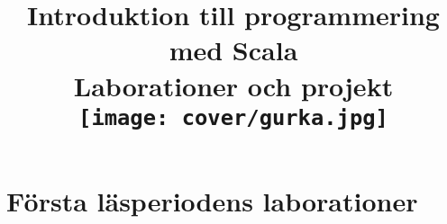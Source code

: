 \documentclass[a4paper]{compendium}
\title{
{\vspace{-3.0cm}\bf\sffamily\Huge\selectfont  Introduktion till programmering med Scala}
\\ \vspace{1em}%
{\sffamily  Laborationer och projekt}\\\vspace{2cm}
\texttt{[image: cover/gurka.jpg]}
}
\date{\raggedbottom%
\vspace{-2em}\begin{minipage}{1.0\textwidth}\centering
\CourseCode, Lp1-2, HT \CurrentYear\\
Datavetenskap, LTH\\
Lunds Universitet\\
~\\
Kompileringsdatum: \today \\
\url{https://lunduniversity.github.io/pgk}
\end{minipage}
}
\newcommand{\SlideHeading}[1]{} %
\begin{document}
\frontmatter
\maketitle

%
%

\setcounter{tocdepth}{2} %
\tableofcontents
\mainmatter


\renewcommand{\Lab}[1]{\newpage\chapter{Laboration: {\tt #1}}\label{section:lab:#1}}
\renewcommand{\Teamlab}[1]{\newpage\chapter{Grupplaboration: {\tt #1}}\label{section:lab:#1}}
\renewcommand{\subsection}{\section}


\part{Första läsperiodens laborationer}


%


%
%
\end{document}
